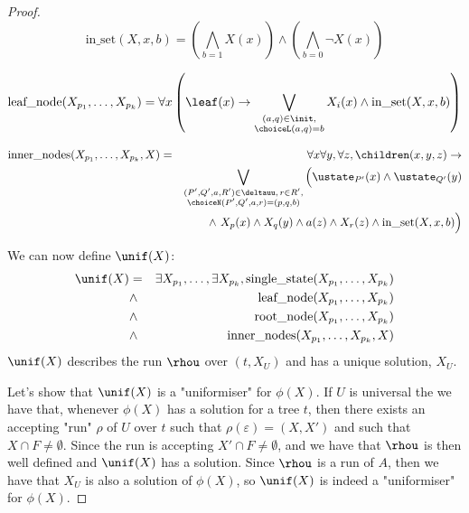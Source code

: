 \documentclass[twoside]{article}
\begin{document}
\begin{proof}
	\begin{equation*}
		\text{in\_set} (X, x, b)  = (\bigwedge_{b = 1}  X(x)) \land (\bigwedge_{b = 0}  \lnot X(x))
	\end{equation*}

	\begin{equation*}
		\text{leaf\_node} (X_{p_1}, \ldots, X_{p_k})  = \forall x \left( \leaf(x) \rightarrow \bigvee_{\substack{(a, q) \in \init,\\ \choiceL(a,q) = b}} X_i(x) \land  \text{in\_set}(X,x,b)  \right)
	\end{equation*}

	\begin{eqnarray*}
		\text{inner\_nodes} (X_{p_1}, \ldots, X_{p_k}, X)  &=& \forall x \forall y, \forall z, \children (x,y,z) \ra \\
		&& \bigvee_{ \substack{(P',Q',a,R')\in \deltauu, \, r \in R', \\ \choiceN(P',Q',a,r) = (p,q,b)}} \Big( \ustate_{P'}(x) \land \ustate_{Q'}(y) \\
		&& \qquad \land \  X_p(x) \land X_q(y) \land a(z) \land X_r(z) \land  \text{in\_set}(X,x,b)\Big)
	\end{eqnarray*}


	We can now define $\unif(X)$:
	\begin{eqnarray*}
		\unif (X) &=& \exists X_{p_1}, \ldots, \exists X_{p_k}, \text{single\_state} (X_{p_1}, \ldots, X_{p_k}) \\
		&\land& \text{leaf\_node} (X_{p_1}, \ldots, X_{p_k})\\
		&\land& \text{root\_node} (X_{p_1}, \ldots, X_{p_k})\\
		&\land& \text{inner\_nodes} (X_{p_1}, \ldots, X_{p_k}, X)
	\end{eqnarray*}
	$\unif(X)$ describes the run $\rhou$ over $(t,X_U)$ and has a unique solution, $X_U$.

	Let's show that $\unif(X)$ is a "uniformiser" for $\phi(X)$.
	If $U$ is universal the we have that, whenever $\phi(X)$ has a solution for a tree $t$, then there exists an accepting "run" $\rho$ of $U$ over $t$
	such that $\rho(\varepsilon) = (X,X')$ and such that $X \cap F \neq \emptyset$. Since the run is accepting $X' \cap F \neq \emptyset$, and we have that
	$\rhou$ is then well defined and $\unif(X)$ has a solution. Since $\rhou$ is a run of $A$, then we have that $X_U$ is also a solution of $\phi(X)$, so
	$\unif(X)$ is indeed a "uniformiser" for $\phi(X)$.

\end{proof}
\end{document}
